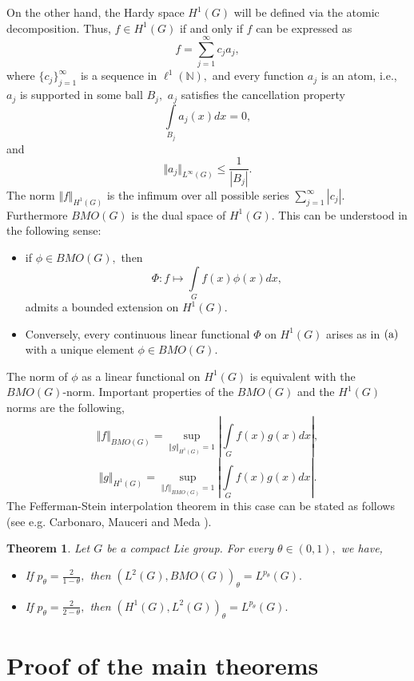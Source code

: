 \documentclass[12pt, reqno]{amsart}
\newtheorem{theorem}{Theorem}[section]
\theoremstyle{definition}
\theoremstyle{remark}
\numberwithin{equation}{section}
\begin{document}
On the other hand, the Hardy space ${H}^{1}(G)$ will be defined via the atomic decomposition. Thus, $f\in {H}^{1}(G)$ if and only if $f$ can be expressed as $$f=\sum_{j=1}^\infty c_{j}a_{j},$$ where $\{c_j\}_{j=1}^\infty$ is a sequence in $\ell^1(\mathbb{N}),$ and every function $a_j$ is an atom, i.e., $a_j$ is supported in some ball $B_j,$ $a_j$ satisfies the cancellation property $$\int\limits_{B_j}a_{j}(x)dx=0,$$ and 
\[ 
    \Vert a_j\Vert_{L^\infty(G)}\leqslant \frac{1}{|B_j|}.
\] The norm $\Vert f\Vert_{{H}^{1}(G)}$ is the infimum over  all possible series $\sum_{j=1}^\infty|c_j|.$ Furthermore ${BMO}(G)$ is the dual space of ${H}^{1}(G)$. This can be understood in the following sense:
\begin{itemize}
    \item[(a)] if $\phi\in {BMO}(G), $ then $$\Phi: f\mapsto \int\limits_{G}f(x)\phi(x)dx,$$ admits a bounded extension on ${H}^{1}(G).$
    \item[(b)] Conversely, every continuous linear functional $\Phi$ on ${H}^{1}(G)$ arises as in $\textnormal{(a)}$ with a unique element $\phi\in {BMO}(G).$
\end{itemize} The norm of $\phi$ as a linear functional on ${H}^{1}(G)$ is equivalent with the ${BMO}(G)$-norm. Important properties of the ${BMO}(G)$ and the ${H}^{1}(G)$ norms are the following,
\begin{equation}\label{BMOnormduality}
 \Vert f \Vert_{{BMO}(G)}  =\sup_{\Vert g\Vert_{{H}^{1}(G)}=1} 
\left| \int\limits_{G}f(x)g(x)dx\right|,\end{equation}
\begin{equation}\label{BMOnormduality'}\Vert g \Vert_{{H}^{1}(G)}  =\sup_{\Vert f\Vert_{{BMO}(G)}=1} 
\left| \int\limits_{G}f(x)g(x)dx\right|.
\end{equation} 
 The Fefferman-Stein interpolation theorem in this case can be stated as follows (see e.g. Carbonaro, Mauceri and Meda \cite{CMM2009}). 
\begin{theorem}
Let $G$ be a compact Lie group.  For every $\theta\in (0,1),$ we have,
\begin{itemize}
    \item If $p_\theta=\frac{2}{1-\theta},$ then $(L^2(G),{BMO}(G))_{\theta}=L^{p_\theta}(G).$ 
    \item If $p_\theta=\frac{2}{2-\theta},$ then $({H}^{1}(G),L^2(G))_{\theta}=L^{p_\theta}(G).$ 
\end{itemize}
\end{theorem}
\section{Proof of the main theorems}\label{Section:3}
\end{document}
